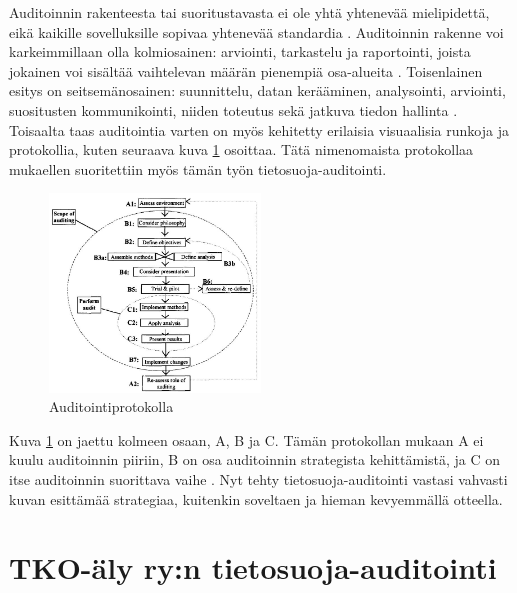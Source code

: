 \documentclass[finnish]{tktltiki}
\begin{document}
Auditoinnin rakenteesta tai suoritustavasta ei ole yhtä yhtenevää mielipidettä, eikä kaikille sovelluksille sopivaa yhtenevää standardia \cite{dimond,aditya,frost,felley}. Auditoinnin rakenne voi karkeimmillaan olla kolmiosainen: arviointi, tarkastelu ja raportointi, joista jokainen voi sisältää vaihtelevan määrän pienempiä osa-alueita \cite{dimond,felley}. Toisenlainen esitys on seitsemänosainen: suunnittelu, datan kerääminen, analysointi, arviointi, suositusten kommunikointi, niiden toteutus sekä jatkuva tiedon hallinta \cite{frost}. Toisaalta taas auditointia varten on myös kehitetty erilaisia visuaalisia runkoja ja protokollia, kuten seuraava kuva \ref{auditointi} osoittaa. Tätä nimenomaista protokollaa mukaellen suoritettiin myös tämän työn tietosuoja-auditointi.
\newline
\begin{figure}[H]
\includegraphics[width=0.5\textwidth]{Overview_of_audit_protocol.JPG}
\centering
\caption{Auditointiprotokolla \cite{dimond} }
\label{auditointi}
\end{figure}

Kuva \ref{auditointi} on jaettu kolmeen osaan, A, B ja C. Tämän protokollan mukaan A ei kuulu auditoinnin piiriin, B on osa auditoinnin strategista kehittämistä, ja C on itse auditoinnin suorittava vaihe \cite{dimond}. Nyt tehty tietosuoja-auditointi vastasi vahvasti kuvan esittämää strategiaa, kuitenkin soveltaen ja hieman kevyemmällä otteella. 

\section{TKO-äly ry:n tietosuoja-auditointi}
\end{document}
